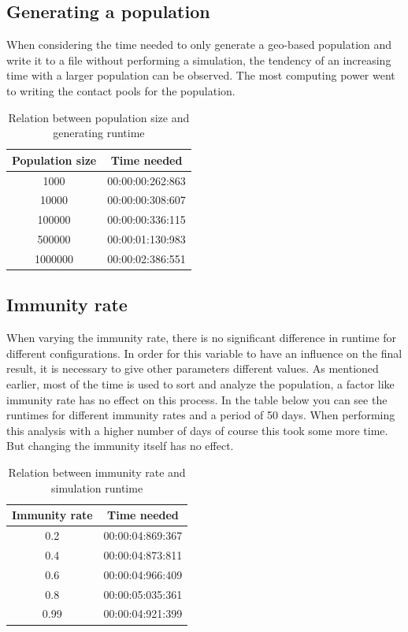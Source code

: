 \documentclass[runningheads]{llncs}
\begin{document}
\subsection{Generating a population}
When considering the time needed to only generate a geo-based population and write it to a file without performing a simulation, the tendency of an increasing time with a larger population can be observed. The most computing power went to writing the contact pools for the population.

\begin{table}
	\caption{Relation between population size and generating runtime}
	\begin{center}
		\begin{tabular}{ | c | c |}
			\hline
			Population size & Time needed \\ \hline
			1000 & 00:00:00:262:863 \\ \hline
			10000 & 00:00:00:308:607 \\ \hline
			100000 & 00:00:00:336:115 \\ \hline
			500000 & 00:00:01:130:983 \\ \hline
			1000000 & 00:00:02:386:551 \\
			\hline
		\end{tabular}
	\end{center}
\end{table}

\subsection{Immunity rate}
When varying the immunity rate, there is no significant difference in runtime for different configurations. In order for this variable to have an influence on the final result, it is necessary to give other parameters different values.  As mentioned earlier, most of the time is used to sort and analyze the population, a factor like immunity rate has no effect on this process. In the table below you can see the runtimes for different immunity rates and a period of 50 days. When performing this analysis with a higher number of days of course this took some more time. But changing the immunity itself has no effect.

\begin{table}
	\caption{Relation between immunity rate and simulation runtime}
	\begin{center}
		\begin{tabular}{ | c | c |}
			\hline
			Immunity rate & Time needed \\ \hline
			0.2 & 00:00:04:869:367 \\ \hline
			0.4 & 00:00:04:873:811 \\ \hline
			0.6 & 00:00:04:966:409 \\ \hline
			0.8 & 00:00:05:035:361 \\ \hline
			0.99 & 00:00:04:921:399 \\
			\hline	
		\end{tabular}
	\end{center}
\end{table}
\end{document}
